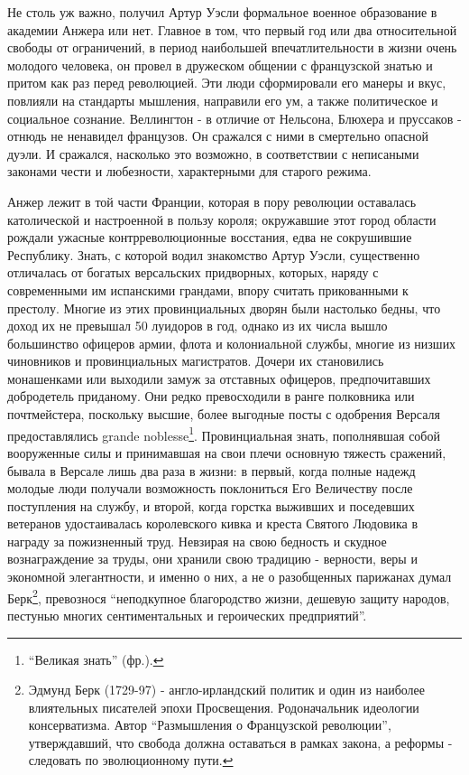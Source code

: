 \documentclass[
  oneside,
  12pt,
  titlepage]{book}
\begin{document}
Не столь уж важно, получил Артур Уэсли формальное военное образование в академии Анжера или нет. Главное в том, что первый год или два относительной свободы от ограничений, в период наибольшей впечатлительности в жизни очень молодого человека, он провел в дружеском общении с французской знатью и притом как раз перед революцией. Эти люди сформировали его манеры и вкус, повлияли на стандарты мышления, направили его ум, а также политическое и социальное сознание. Веллингтон - в отличие от Нельсона, Блюхера и пруссаков - отнюдь не ненавидел французов. Он сражался с ними в смертельно опасной дуэли. И сражался, насколько это возможно, в соответствии с неписаными законами чести и любезности, характерными для старого режима.

Анжер лежит в той части Франции, которая в пору революции оставалась католической и настроенной в пользу короля; окружавшие этот город области рождали ужасные контрреволюционные восстания, едва не сокрушившие Республику. Знать, с которой водил знакомство Артур Уэсли, существенно отличалась от богатых версальских придворных, которых, наряду с современными им испанскими грандами, впору считать прикованными к престолу. Многие из этих провинциальных дворян были настолько бедны, что доход их не превышал 50 луидоров в год, однако из их числа вышло большинство офицеров армии, флота и колониальной службы, многие из низших чиновников и провинциальных магистратов. Дочери их становились монашенками или выходили замуж за отставных офицеров, предпочитавших добродетель приданому. Они редко превосходили в ранге полковника или почтмейстера, поскольку высшие, более выгодные посты с одобрения Версаля предоставлялись grande noblesse\footnote{``Великая знать'' (фр.).}. Провинциальная знать, пополнявшая собой вооруженные силы и принимавшая на свои плечи основную тяжесть сражений, бывала в Версале лишь два раза в жизни: в первый, когда полные надежд молодые люди получали возможность поклониться Его Величеству после поступления на службу, и второй, когда горстка выживших и поседевших ветеранов удостаивалась королевского кивка и креста Святого Людовика в награду за пожизненный труд. Невзирая на свою бедность и скудное вознаграждение за труды, они хранили свою традицию - верности, веры и экономной элегантности, и именно о них, а не о разобщенных парижанах думал Берк\footnote{Эдмунд Берк (1729-97) - англо-ирландский политик и один из наиболее влиятельных писателей эпохи Просвещения. Родоначальник идеологии консерватизма. Автор ``Размышления о Французской революции'', утверждавший, что свобода должна оставаться в рамках закона, а реформы - следовать по эволюционному пути.}, превознося ``неподкупное благородство жизни, дешевую защиту народов, пестунью многих сентиментальных и героических предприятий''.
\end{document}
